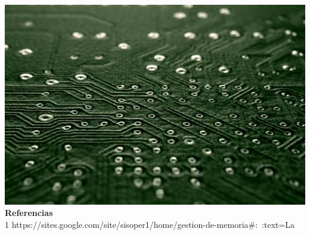 \documentclass{article}
\begin{document}
\includegraphics[scale=0.5]{computer-4491980_1920.jpg}
\centering
\vspace{2cm} \\

\textbf{Referencias} \vspace{1cm} \\
1 https://sites.google.com/site/sisoper1/home/gestion-de-memoria#:~:text=La%
\end{document}
